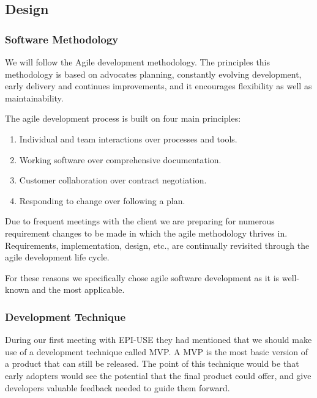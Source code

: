 \subsection{Design}

	\subsubsection{Software Methodology}
	We will follow the Agile development methodology. The principles this methodology is based on advocates planning, constantly evolving development, early delivery and continues improvements, and it encourages flexibility as well as maintainability.

	\begin{flushleft}
	The agile development process is built on four main principles:
		\begin{enumerate}
			\item Individual and team interactions over processes and tools.
			\item Working software over comprehensive documentation.
			\item Customer collaboration over contract negotiation.
			\item Responding to change over following a plan.
		\end{enumerate}
	\end{flushleft}

\begin{flushleft}
Due to frequent meetings with the client we are preparing for numerous requirement changes to be made in which the agile methodology thrives in. Requirements, implementation, design, etc., are continually revisited through the agile development life cycle.

\bigskip

For these reasons we specifically chose agile software development as it is well-known and the most applicable.
\end{flushleft}

	\subsubsection{Development Technique}
	During our first meeting with EPI-USE they had mentioned that we should make use of a development technique called MVP. A MVP is the most basic version of a product that can still be released. The point of this technique would be that early adopters would see the potential that the final product could offer, and give developers valuable feedback needed to guide them forward.

